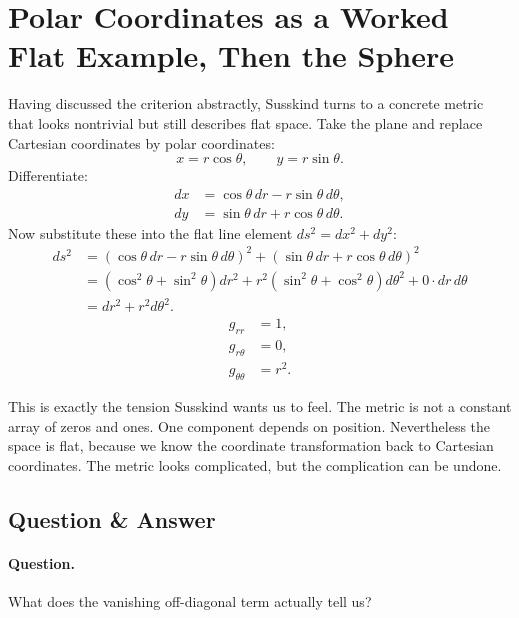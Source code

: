 \section{Polar Coordinates as a Worked Flat Example, Then the Sphere}

Having discussed the criterion abstractly, Susskind turns to a concrete metric that looks nontrivial but still describes flat space. Take the plane and replace Cartesian coordinates by polar coordinates:
\begin{equation}
x=r\cos\theta,
\qquad
y=r\sin\theta.
\end{equation}
Differentiate:
\begin{align}
dx &= \cos\theta\,dr-r\sin\theta\,d\theta, \\
dy &= \sin\theta\,dr+r\cos\theta\,d\theta.
\end{align}
Now substitute these into the flat line element \(ds^{2}=dx^{2}+dy^{2}\):
\begin{align}
ds^{2}
&=
\left(\cos\theta\,dr-r\sin\theta\,d\theta\right)^{2}
+
\left(\sin\theta\,dr+r\cos\theta\,d\theta\right)^{2} \\
&=
\left(\cos^{2}\theta+\sin^{2}\theta\right)dr^{2}
+
r^{2}\left(\sin^{2}\theta+\cos^{2}\theta\right)d\theta^{2}
+
0\cdot dr\,d\theta \\
&=
dr^{2}+r^{2}d\theta^{2}.
\end{align}
\begin{equation}
\begin{aligned}
g_{rr}&=1,\\
g_{r\theta}&=0,\\
g_{\theta\theta}&=r^{2}.
\end{aligned}
\end{equation}

This is exactly the tension Susskind wants us to feel. The metric is not a constant array of zeros and ones. One component depends on position. Nevertheless the space is flat, because we know the coordinate transformation back to Cartesian coordinates. The metric looks complicated, but the complication can be undone.

\subsection{Question \& Answer}

\paragraph{Question.} What does the vanishing off-diagonal term actually tell us?


